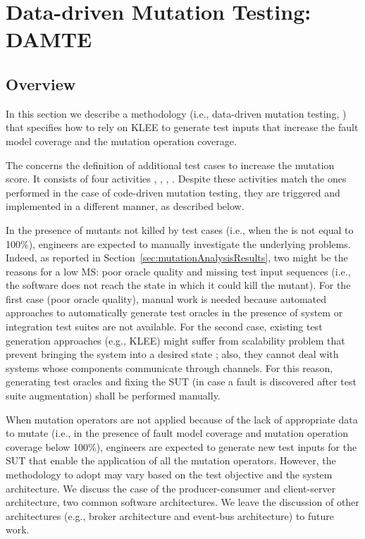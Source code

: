


\clearpage
\section{Data-driven Mutation Testing: DAMTE} %
\label{sec:data:test_suite_augmentation}

\STARTCHANGEDWPT

\subsection{Overview}

In this section we describe a methodology (i.e., data-driven mutation testing, ) that specifies how to rely on KLEE to generate test inputs that increase the fault model coverage and the mutation operation coverage.

The  concerns the definition of additional test cases to increase the mutation score.
It consists of four activities , , , . 
Despite these activities match the ones performed in the case of code-driven mutation testing, they are triggered and implemented in a different manner, as described below.

In the presence of mutants not killed by test cases (i.e., when the   is not equal to 100\%), engineers are expected to manually investigate the underlying problems. Indeed, as reported in Section~\ref{sec:mutationAnalysisResults}, two might be the reasons for a low MS: poor oracle quality and missing test input sequences (i.e., the software does not reach the state in which it could kill the mutant).
For the first case (poor oracle quality), manual work is needed because automated approaches to automatically generate test oracles in the presence of system or integration test suites are not available. For the second case, existing test generation approaches (e.g., KLEE) might suffer from scalability problem that prevent bringing the system into a desired state ; also, they cannot deal with systems whose components communicate through channels. For this reason, generating test oracles and fixing the SUT (in case a fault is discovered after test suite augmentation) shall be performed manually.

When mutation operators are not applied because of the lack of appropriate data to mutate (i.e., in the presence of fault model coverage and mutation operation coverage below 100\%), engineers are expected to generate new test inputs for the SUT that enable the application of all the mutation operators. 
However, the methodology to adopt may vary based on the test objective and the system architecture. 
We discuss the case of the producer-consumer and client-server architecture, two common software architectures. We leave the discussion of other architectures (e.g., broker architecture and event-bus architecture) to future work.

